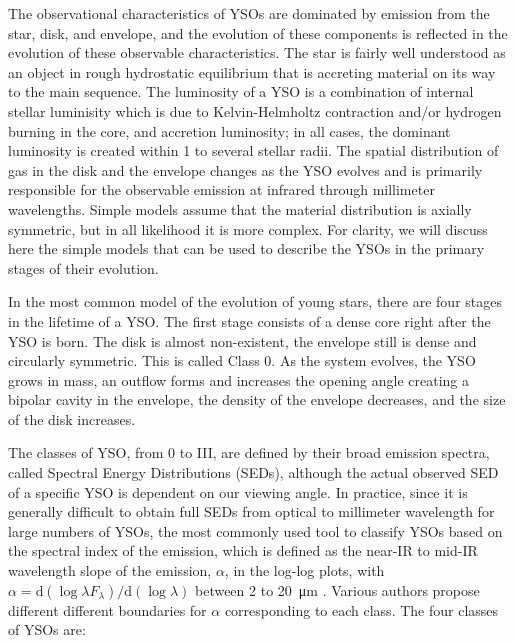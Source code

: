 The observational characteristics of YSOs are dominated by emission from the
 star, disk, and envelope, and the evolution of these components is reflected in the evolution of these observable characteristics. 
The star is fairly well understood as an object in rough hydrostatic equilibrium that is accreting material on its way to the main sequence. The luminosity of a YSO is a combination of internal stellar luminisity which is due to Kelvin-Helmholtz contraction and/or hydrogen burning in the core, and accretion luminosity; in  all cases, the dominant luminosity is created within 1 to several stellar radii. The spatial distribution of gas in the disk and the envelope changes as the
YSO evolves and is primarily responsible for the observable emission at infrared through millimeter wavelengths. Simple models assume that the material distribution is axially symmetric, but in all likelihood it is more complex. 
For clarity, we will discuss here the simple models that can be used to describe the YSOs in the primary stages of their evolution.

In the most common model of the evolution of young stars, there are four stages in the lifetime of a YSO. The first stage consists of a dense core right after the YSO is born. The disk is almost non-existent, the envelope still is dense and circularly symmetric. This is called Class 0. As the system evolves, the YSO grows in mass, an outflow forms and increases the opening angle creating a bipolar cavity in the envelope, the density of the envelope decreases, and the size of the disk increases.

The classes of YSO, from 0 to III, are defined by their broad emission spectra, called Spectral Energy Distributions (SEDs),  although the actual observed SED of a specific YSO is dependent on our viewing angle. In practice, since it is generally difficult to obtain full SEDs from optical to millimeter wavelength for large numbers of YSOs, the most commonly used tool to classify YSOs based on the spectral index of the emission, which is defined as the near-IR to mid-IR wavelength slope of the emission, $\alpha$, in the log-log plots, with $\alpha = \textrm{d}(\log\lambda F_\lambda)/\textrm{d}(\log\lambda)$ between 2 to \SI{20}{\micro\meter} \citep{McKee:2007bd}. Various authors propose different different boundaries for $\alpha$ corresponding to each class. The four classes of YSOs are:


